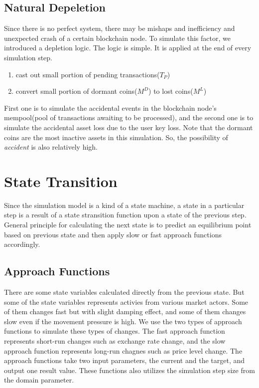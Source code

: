\documentclass[a4paper,11pt]{scrartcl}
\begin{document}
\subsection{Natural Depeletion}
Since there is no perfect system, there may be mishaps and inefficiency and
unexpected crash of a certain blockchain node. To simulate this factor, we
introduced a depletion logic. The logic is simple. It is applied at the end of
every simulation step.
\begin{enumerate}
	\item{cast out small portion of pending transactions($T_P$)}
	\item{convert small portion of dormant coins($M^D$) to lost coins($M^L$)}
\end{enumerate}
First one is to simulate the accidental events in the blockchain node's
mempool(pool of transactions awaiting to be processed), and the second one is
to simulate the accidental asset loss due to the user key loss. Note that the
dormant coins are the most inactive assets in this simulation. So, the
possibility of \emph{accident} is also relatively high.

\section{State Transition}
Since the simulation model is a kind of a state machine, a state in a
particular step is a result of a state stransition function upon a state of the
previous step. General principle for calculating the next state is to predict
an equilibrium point based on previous state and then apply slow or fast
approach functions accordingly.

\subsection{Approach Functions}
There are some state variables calculated directly from the previous state. But
some of the state variables represents activies from various market actors.
Some of them changes fast but with slight damping effect, and some of them
changes slow even if the movement pressure is high. We use the two types of
approach functions to simulate these types of changes. The fast approach
function represents short-run changes such as exchange rate change, and the
slow approach function represents long-run chagnes such as price level change.
The approach functions take two input parameters, the current and the target,
and output one result value. These functions also utilizes the simulation step
size from the domain parameter.
\end{document}
